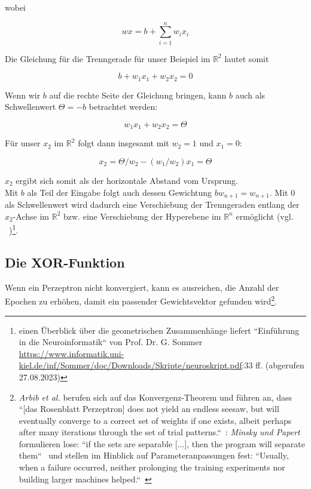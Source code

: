 \noindent
wobei

\begin{equation}
wx = b + \sum^n_{i=1} w_ix_i
\label{eq:gl-net}
\end{equation}

\noindent
Die Gleichung für die Trenngerade für unser Beispiel im $\mathbb{R}^2$ lautet somit

\begin{equation}
b + w_1x_1 + w_2x_2 = 0
\end{equation}

\noindent
Wenn wir $b$ auf die rechte Seite der Gleichung bringen, kann $b$ auch als Schwellenwert $\Theta = -b$ betrachtet werden:

\begin{equation}
w_1x_1 + w_2x_2 = \Theta
\end{equation}

\noindent
Für unser $x_2$ im $ \mathbb{R}^2$ folgt dann insgesamt mit $w_2 = 1$ und $x_1 = 0$:

\begin{equation}
x_2 = \Theta/w_2 -(w_1/w_2)x_1  = \Theta
\end{equation}

\noindent
$x_2$ ergibt sich somit als der horizontale Abstand vom Ursprung.\\

\noindent
Mit $b$ als Teil der Eingabe folgt auch dessen Gewichtung $bw_{n+1} = w_{n+1}$.
Mit $0$ als Schwellenwert wird dadurch eine Verschiebung der Trenngeraden entlang der $x_2$-Achse im $ \mathbb{R}^2$ bzw. eine Verschiebung der Hyperebene im $ \mathbb{R}^n$ ermöglicht (vgl. ~\cite[215]{Ert21a})\footnote{
    einen Überblick über die geometrischen Zusammenhänge liefert ``Einführung in die Neuroinformatik`` von Prof. Dr. G. Sommer \url{https://www.informatik.uni-kiel.de/inf/Sommer/doc/Downloads/Skripte/neuroskript.pdf}:33 ff. (abgerufen 27.08.2023)
}.



\subsection{Die XOR-Funktion}

Wenn ein Perzeptron nicht konvergiert, kann es ausreichen, die Anzahl der Epochen zu erhöhen, damit ein passender Gewichtsvektor gefunden wird\footnote{
    \textit{Arbib et al.} berufen sich auf das Konvergenz-Theorem und führen an, dass ``[das Rosenblatt Perzeptron] does not yield an endless seesaw, but will eventually converge to a correct set of weights if one exists, albeit perhaps after many iterations through the set of trial patterns.``~\cite[20]{Arb03}: \textit{Minsky und Papert} formulieren lose: ``if the sets are separable [...], then the program will separate them``~\cite[165]{MP88} und stellen im Hinblick auf Parameteranpassungen fest: ``Usually, when a failure occurred, neither prolonging the training experiments nor building larger machines helped.``~\cite[xi]{MP88}
}.

